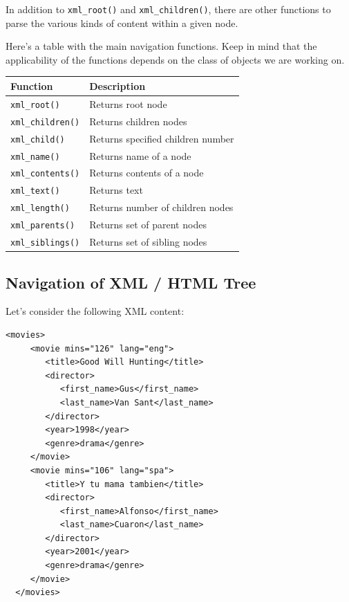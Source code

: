 \documentclass[
]{book}
\begin{document}
In addition to \texttt{xml\_root()} and \texttt{xml\_children()}, there are other functions
to parse the various kinds of content within a given node.

Here's a table with the main navigation functions. Keep in mind that the
applicability of the functions depends on the class of objects we are working on.

\begin{longtable}[]{@{}ll@{}}
\toprule\noalign{}
Function & Description \\
\midrule\noalign{}
\endhead
\bottomrule\noalign{}
\endlastfoot
\texttt{xml\_root()} & Returns root node \\
\texttt{xml\_children()} & Returns children nodes \\
\texttt{xml\_child()} & Returns specified children number \\
\texttt{xml\_name()} & Returns name of a node \\
\texttt{xml\_contents()} & Returns contents of a node \\
\texttt{xml\_text()} & Returns text \\
\texttt{xml\_length()} & Returns number of children nodes \\
\texttt{xml\_parents()} & Returns set of parent nodes \\
\texttt{xml\_siblings()} & Returns set of sibling nodes \\
\end{longtable}

\hypertarget{navigation-of-xml-html-tree}{%
\subsection{Navigation of XML / HTML Tree}\label{navigation-of-xml-html-tree}}

Let's consider the following XML content:

\begin{verbatim}
<movies>
     <movie mins="126" lang="eng">
        <title>Good Will Hunting</title>
        <director>
           <first_name>Gus</first_name>
           <last_name>Van Sant</last_name>
        </director>
        <year>1998</year>
        <genre>drama</genre>
     </movie>
     <movie mins="106" lang="spa">
        <title>Y tu mama tambien</title>
        <director>
           <first_name>Alfonso</first_name>
           <last_name>Cuaron</last_name>
        </director>
        <year>2001</year>
        <genre>drama</genre>
     </movie>
  </movies>
\end{verbatim}
\end{document}
